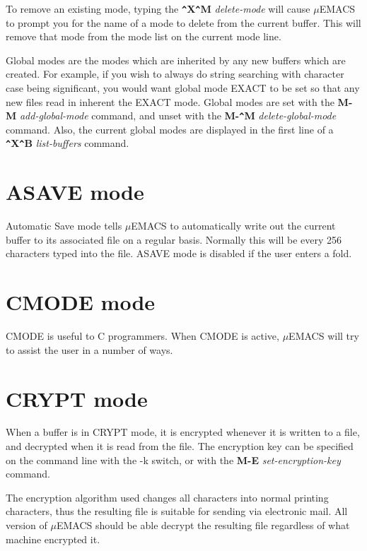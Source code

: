 To remove an existing mode, typing the {\bf \verb+^+X\verb+^+M} {\it
delete-mode} will cause $\mu$EMACS to prompt you for the name of a mode to
delete from the current buffer. This will remove that mode from the
mode list on the current mode line.

Global modes are the modes which are inherited by any new buffers which
are created. For example, if you wish to always do string searching
with character case being significant, you would want global mode EXACT
to be set so that any new files read in inherent the EXACT mode. Global
modes are set with the {\bf M-M} {\it add-global-mode} command, and
unset with the {\bf M-\verb+^+M} {\it delete-global-mode} command.
Also, the current global modes are displayed in the first line of a
{\bf \verb+^+X\verb+^+B} {\it list-buffers} command.

\section{ASAVE mode}

Automatic Save mode tells $\mu$EMACS to automatically write out the
current buffer to its associated file on a regular basis. Normally this
will be every 256 characters typed into the file. ASAVE mode is disabled
if the user enters a fold.

\section{CMODE mode}

CMODE is useful to C programmers. When CMODE is active, $\mu$EMACS will
try to assist the user in a number of ways.

\section{CRYPT mode}

When a buffer is in CRYPT mode, it is encrypted whenever it is written
to a file, and decrypted when it is read from the file. The encryption
key can be specified on the command line with the -k switch, or with
the {\bf M-E} {\it set-encryption-key} command.

The encryption algorithm used changes all characters into normal
printing characters, thus the resulting file is suitable for sending
via electronic mail. All version of $\mu$EMACS should be able decrypt
the resulting file regardless of what machine encrypted it.

